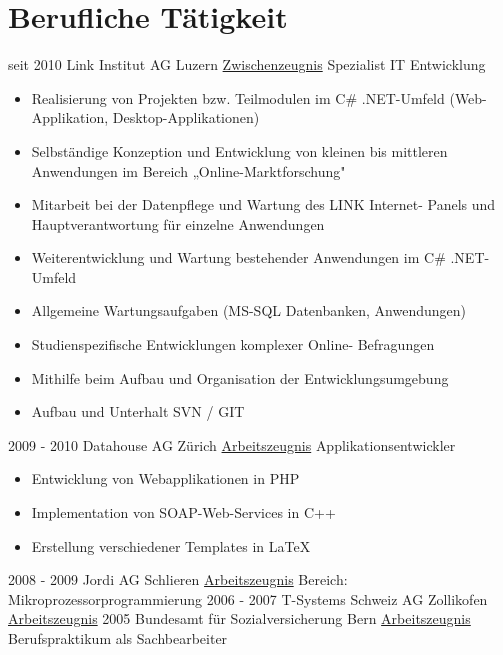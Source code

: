 \documentclass[a4paper]{twentysecondcv} %
\begin{document}


\makeprofile %
\hypertarget{work_back}{}
\section{Berufliche Tätigkeit}
\begin{twenty}
	\twentyitem
    	{seit 2010}
        {}
        {Link Institut AG \textnormal{Luzern}}
        {\hyperlink{link}{\textcolor{pblue}{Zwischenzeugnis}}}
        {Spezialist IT Entwicklung}
        {\begin{itemize}
\item Realisierung von Projekten bzw. Teilmodulen im C\# .NET-Umfeld
(Web-Applikation, Desktop-Applikationen)
\item Selbständige Konzeption und Entwicklung von kleinen bis
mittleren Anwendungen im Bereich „Online-Marktforschung"
\item Mitarbeit bei der Datenpflege und Wartung des LINK Internet-
Panels und Hauptverantwortung für einzelne Anwendungen
\item Weiterentwicklung und Wartung bestehender Anwendungen im
C\# .NET-Umfeld
\item Allgemeine Wartungsaufgaben (MS-SQL Datenbanken,
Anwendungen)
\item Studienspezifische Entwicklungen komplexer Online-
Befragungen
\item Mithilfe beim Aufbau und Organisation der
Entwicklungsumgebung
\item Aufbau und Unterhalt SVN \// GIT
	\end{itemize}}		
	\twentyitem
    	{}
        {}
        {}
        {}
        {}
        {}
	\twentyitem
    	{2009 - 2010}
        {}
        {Datahouse AG \textnormal{Zürich}}
        {\hyperlink{datahouse}{\textcolor{pblue}{Arbeitszeugnis}}}
        {Applikationsentwickler}
        {
		\begin{itemize}
		\item Entwicklung von Webapplikationen in PHP
		\item Implementation von SOAP-Web-Services in C++
		\item Erstellung verschiedener Templates in \LaTeX
		\end{itemize}
	}	
	\twentyitem
    	{}
        {}
        {}
        {}
        {}
        {}
	\twentyitem
    	{2008 - 2009}
        {}
        {Jordi AG \textnormal{Schlieren}}
        {\hyperlink{jordi}{\textcolor{pblue}{Arbeitszeugnis}}}
        {Bereich: Mikroprozessorprogrammierung}
        {}
	\twentyitem
    	{2006 - 2007}
        {}
        {T-Systems Schweiz AG \textnormal{Zollikofen}}
        {\hyperlink{tsystems}{\textcolor{pblue}{Arbeitszeugnis}}}
        {}
        {}
	\twentyitem
    	{2005}
        {}
        {Bundesamt für Sozialversicherung \textnormal{Bern}}
        {\hyperlink{bsv}{\textcolor{pblue}{Arbeitszeugnis}}}
        {Berufspraktikum als Sachbearbeiter}
        {}


\end{twenty}
\end{document}
